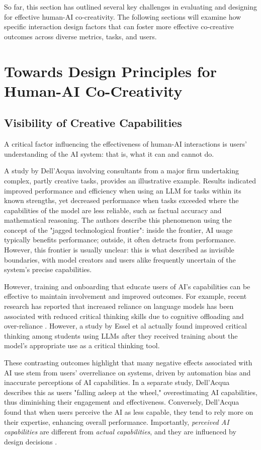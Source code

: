 So far, this section has outlined several key challenges in evaluating and designing for effective human-AI co-creativity. The following sections will examine how specific interaction design factors that can foster more effective co-creative outcomes across diverse metrics, tasks, and users. 

\section{Towards Design Principles for Human-AI Co-Creativity}

\subsection{Visibility of Creative Capabilities}

A critical factor influencing the effectiveness of human-AI interactions is users' understanding of the AI system: that is, what it can and cannot do.

A study by Dell’Acqua \cite{DellAcqua2023-og} involving consultants from a major firm undertaking complex, partly creative tasks, provides an illustrative example. Results indicated improved performance and efficiency when using an LLM for tasks within its known strengths, yet decreased performance when tasks exceeded where the capabilities of the model are less reliable, such as factual accuracy and mathematical reasoning. The authors describe this phenomenon using the concept of the "jagged technological frontier": inside the frontier, AI usage typically benefits performance; outside, it often detracts from performance. However, this frontier is usually unclear: this is what \cite{Buschek2021-ks} described as invisible boundaries, with model creators and users alike frequently uncertain of the system’s precise capabilities.

However, training and onboarding that educate users of AI's capabilities can be effective to maintain involvement and improved outcomes. For example, recent research has reported that increased reliance on language models has been associated with reduced critical thinking skills due to cognitive offloading and over-reliance \cite{Gerlich2025-as, Lee2025-dw}. However, a study by Essel et al \cite{Essel2024-qc} actually found improved critical thinking among students using LLMs after they received training about the model's appropriate use as a critical thinking tool.

These contrasting outcomes highlight that many negative effects associated with AI use stem from users’ overreliance on systems, driven by automation bias and inaccurate perceptions of AI capabilities. In a separate study, Dell’Acqua \cite{Dell-Acqua2022-dy} describes this as users "falling asleep at the wheel," overestimating AI capabilities, thus diminishing their engagement and effectiveness. Conversely, Dell’Acqua found that when users perceive the AI as less capable, they tend to rely more on their expertise, enhancing overall performance. Importantly, \textit{perceived AI capabilities} are different from \textit{actual capabilities}, and they are influenced by design decisions \cite{Moruzzi2022-tx, Lawton2023-tb}.

